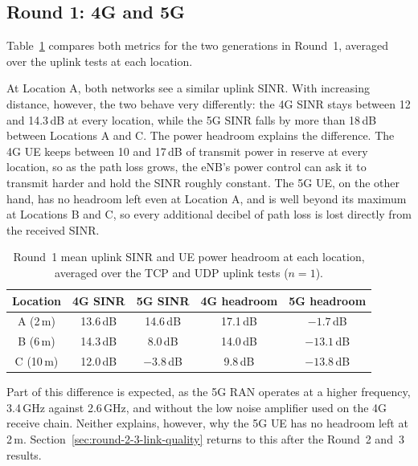 \subsection{Round 1: 4G and 5G}
\label{sec:round-1-link-quality}

Table~\ref{tab:r1-link-quality} compares both metrics for the two generations in Round~1, averaged over the uplink tests at each location.

At Location A, both networks see a similar uplink \gls{SINR}. With increasing distance, however, the two behave very differently: the 4G \gls{SINR} stays between 12 and 14.3\,dB at every location, while the 5G \gls{SINR} falls by more than 18\,dB between Locations A and C. The power headroom explains the difference. The 4G \gls{UE} keeps between 10 and 17\,dB of transmit power in reserve at every location, so as the path loss grows, the \gls{eNB}'s power control can ask it to transmit harder and hold the \gls{SINR} roughly constant. The 5G \gls{UE}, on the other hand, has no headroom left even at Location A, and is well beyond its maximum at Locations B and C, so every additional decibel of path loss is lost directly from the received \gls{SINR}.

\begin{table}[htbp]
    \centering
    \begin{tabular}{|c|c|c|c|c|}
        \hline
        \textbf{Location} & \textbf{4G SINR} & \textbf{5G SINR} & \textbf{4G headroom} & \textbf{5G headroom} \\
        \hline
        A (2\,m) & 13.6\,dB & 14.6\,dB & 17.1\,dB & $-1.7$\,dB \\
        \hline
        B (6\,m) & 14.3\,dB & 8.0\,dB & 14.0\,dB & $-13.1$\,dB \\
        \hline
        C (10\,m) & 12.0\,dB & $-3.8$\,dB & 9.8\,dB & $-13.8$\,dB \\
        \hline
    \end{tabular}
    \caption[Round 1 uplink SINR and UE power headroom.]{Round~1 mean uplink \gls{SINR} and \gls{UE} power headroom at each location, averaged over the TCP and UDP uplink tests ($n=1$).}
    \label{tab:r1-link-quality}
\end{table}

Part of this difference is expected, as the 5G \gls{RAN} operates at a higher frequency, 3.4\,GHz against 2.6\,GHz, and without the low noise amplifier used on the 4G receive chain. Neither explains, however, why the 5G \gls{UE} has no headroom left at 2\,m. Section~\ref{sec:round-2-3-link-quality} returns to this after the Round~2 and~3 results.

